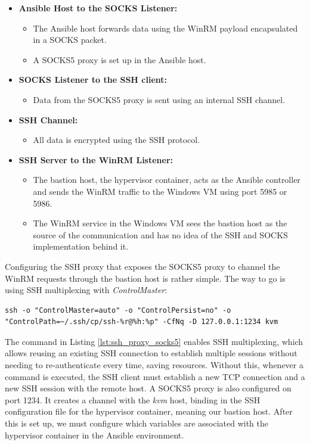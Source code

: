 \begin{itemize}
    \item \textbf{Ansible Host to the SOCKS Listener:}
        \begin{itemize}
            \item The Ansible host forwards data using the WinRM payload encapsulated in a SOCKS packet.
            \item A SOCKS5 proxy is set up in the Ansible host.
        \end{itemize}
    \item \textbf{SOCKS Listener to the SSH client:}
        \begin{itemize}
            \item Data from the SOCKS5 proxy is sent using an internal SSH channel.
        \end{itemize}
    \item \textbf{SSH Channel:}
        \begin{itemize}
            \item All data is encrypted using the SSH protocol.
        \end{itemize}
    \item \textbf{SSH Server to the WinRM Listener:}
        \begin{itemize}
            \item The bastion host, the hypervisor container, acts as the Ansible controller and sends the WinRM traffic to the Windows VM using port 5985 or 5986.
            \item The WinRM service in the Windows VM sees the bastion host as the source of the communication and has no idea of the SSH and SOCKS implementation behind it.
        \end{itemize}
\end{itemize}

Configuring the SSH proxy that exposes the SOCKS5 proxy to channel the WinRM requests through the bastion host is rather simple. The way to go is using SSH multiplexing with \textit{ControlMaster}:

\begin{lstlisting}[caption=SSH Proxy Exposing SOCKS5 Proxy.,numbers=none,label={lst:ssh_proxy_socks5}]
ssh -o "ControlMaster=auto" -o "ControlPersist=no" -o "ControlPath=~/.ssh/cp/ssh-%r@%h:%p" -CfNq -D 127.0.0.1:1234 kvm
\end{lstlisting}

The command in Listing \ref{lst:ssh_proxy_socks5} enables SSH multiplexing, which allows reusing an existing SSH connection to establish multiple sessions without needing to re-authenticate every time, saving resources. Without this, whenever a command is executed, the SSH client must establish a new TCP connection and a new SSH session with the remote host. A SOCKS5 proxy is also configured on port 1234. It creates a channel with the \textit{kvm} host, binding in the SSH configuration file for the hypervisor container, meaning our bastion host. After this is set up, we must configure which variables are associated with the hypervisor container in the Ansible environment.

